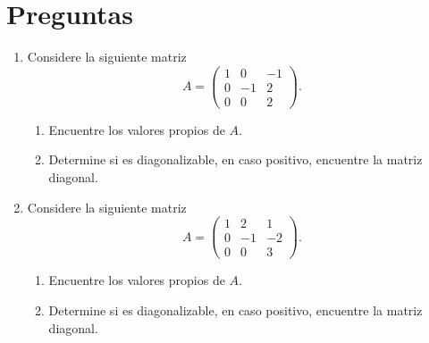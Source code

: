 \documentclass[a4paper]{article}
\begin{document}
\thispagestyle{fancy}
\vspace*{1cm}




\section*{Preguntas}
\begin{enumerate}


    \item Considere la siguiente matriz
\[    A=\begin{pmatrix} 1 &0 & -1 \\ 0 & -1 & 2 \\ 0 & 0 & 2 \end{pmatrix}.\]
\begin{enumerate}
    \item Encuentre los valores propios de $A$.
    \item Determine si es diagonalizable, en caso positivo, encuentre la matriz diagonal.
\end{enumerate}
    \item Considere la siguiente matriz
\[    A=\begin{pmatrix} 1 &2 & 1 \\ 0 & -1 & -2 \\ 0 & 0 & 3 \end{pmatrix}.\]
\begin{enumerate}
    \item Encuentre los valores propios de $A$.
    \item Determine si es diagonalizable, en caso positivo, encuentre la matriz diagonal.
\end{enumerate}


        









\end{enumerate}
\end{document}
